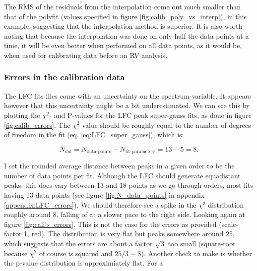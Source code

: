     The RMS of the residuals from the interpolation come out much smaller than that of the polyfit (values specified in figure \ref{fig:calib_poly_vs_interp}), in this example, suggesting that the interpolation method is superior. It is also worth noting that because the interpolation was done on only half the data points at a time, it will be even better when performed on all data points, as it would be, when used for calibrating data before an RV analysis.

    \vspace{0.5cm}


    




    \subsubsection{Errors in the calibration data}

    The LFC fits files come with an uncertainty on the spectrum-variable. It appears however that this uncertainty might be a bit underestimated. We can see this by plotting the $\chi^2$- and P-values for the LFC peak super-gauss fits, as done in figure \ref{fig:calib_errors}. The $\chi^2$ value should be roughly equal to the number of degrees of freedom in the fit (eq. \ref{eq:LFC_super_gauss}), which is: 

    \begin{equation}
        \label{eq:ndof}
        N_\text{dof} = N_\text{data-points} - N_\text{fit-parameters} =  13 - 5 = 8.
    \end{equation}

    I set the rounded average distance between peaks in a given order to be the number of data points per fit. Although the LFC should generate equadistant peaks, this does vary between 13 and 18 points as we go through orders, most fits having 13 data points (see figure \ref{fig:N_data_points} in appendix \ref{appendix:LFC_errors}). We should therefore see a spike in the $\chi^2$ distribution roughly around 8, falling of at a slower pace to the right side. Looking again at figure \ref{fig:calib_errors}. This is not the case for the errors as provided (scale-factor 1, red). The distribution is very flat but peaks somewhere around 25, which suggests that the errors are about a factor $\sqrt{3}$ too small (square-root because $\chi^2$ of course is squared and $25/3 \sim 8$). 
    Another check to make is whether the p-value distribution is approximiately flat. For a 

